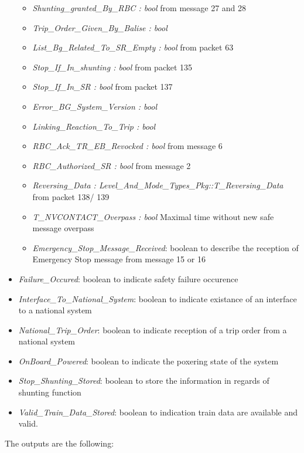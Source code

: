 \begin{itemize}
\begin{itemize}
\item \emph{Shunting\_granted\_By\_RBC : bool} from message 27 and 28
\item \emph{Trip\_Order\_Given\_By\_Balise : bool}
\item \emph{List\_Bg\_Related\_To\_SR\_Empty : bool} from packet 63
\item \emph{Stop\_If\_In\_shunting : bool} from packet 135
\item \emph{Stop\_If\_In\_SR : bool} from packet 137
\item \emph{Error\_BG\_System\_Version : bool}
\item \emph{Linking\_Reaction\_To\_Trip : bool}
\item \emph{RBC\_Ack\_TR\_EB\_Revocked : bool} from message 6
\item \emph{RBC\_Authorized\_SR : bool} from message 2
\item \emph{Reversing\_Data : Level\_And\_Mode\_Types\_Pkg::T\_Reversing\_Data} from packet 138/ 139
\item \emph{T\_NVCONTACT\_Overpass : bool} Maximal time without new safe message overpass
\item \emph{Emergency\_Stop\_Message\_Received}: boolean to describe the reception of Emergency Stop message  from message 15 or 16
\end{itemize}
\item \emph{Failure\_Occured}: boolean to indicate safety failure occurence	
\item \emph{Interface\_To\_National\_System}: boolean to indicate existance of an interface to a national system 	  	
\item \emph{National\_Trip\_Order}: boolean to indicate reception of a trip order from a national system 	  	
\item \emph{OnBoard\_Powered}: boolean to indicate the poxering state of the system 	  	
\item \emph{Stop\_Shunting\_Stored}: boolean to store the information in regards of shunting function	  	
\item \emph{Valid\_Train\_Data\_Stored}: boolean to indication train data are available and valid.
\end{itemize}

The outputs are the following:

